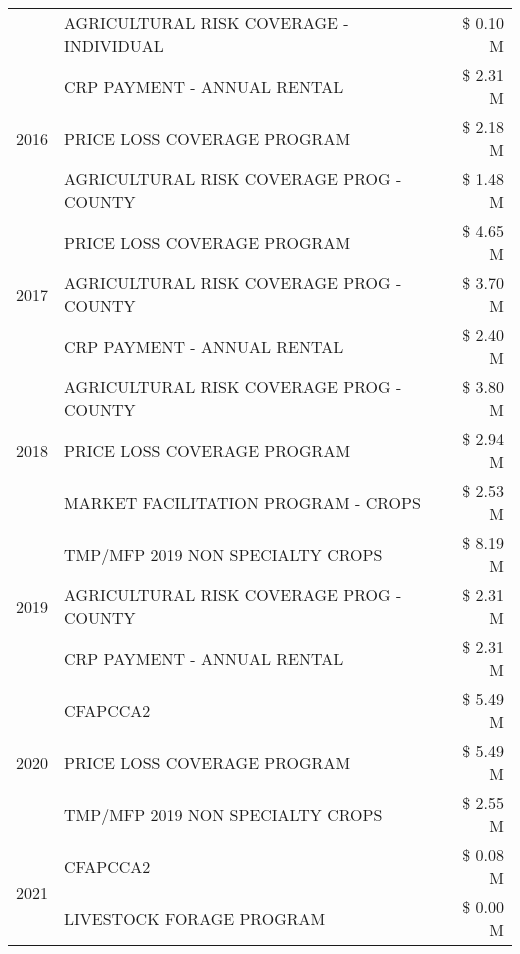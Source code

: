 \begin{tabular}{llr}
 & AGRICULTURAL RISK COVERAGE - INDIVIDUAL & \$ 0.10 M \\
\cline{1-3}
\multirow[t]{3}{*}{2016} & CRP PAYMENT - ANNUAL RENTAL & \$ 2.31 M \\
 & PRICE LOSS COVERAGE PROGRAM & \$ 2.18 M \\
 & AGRICULTURAL RISK COVERAGE PROG - COUNTY & \$ 1.48 M \\
\cline{1-3}
\multirow[t]{3}{*}{2017} & PRICE LOSS COVERAGE PROGRAM & \$ 4.65 M \\
 & AGRICULTURAL RISK COVERAGE PROG - COUNTY & \$ 3.70 M \\
 & CRP PAYMENT - ANNUAL RENTAL & \$ 2.40 M \\
\cline{1-3}
\multirow[t]{3}{*}{2018} & AGRICULTURAL RISK COVERAGE PROG - COUNTY & \$ 3.80 M \\
 & PRICE LOSS COVERAGE PROGRAM & \$ 2.94 M \\
 & MARKET FACILITATION PROGRAM - CROPS & \$ 2.53 M \\
\cline{1-3}
\multirow[t]{3}{*}{2019} & TMP/MFP 2019 NON SPECIALTY CROPS & \$ 8.19 M \\
 & AGRICULTURAL RISK COVERAGE PROG - COUNTY & \$ 2.31 M \\
 & CRP PAYMENT - ANNUAL RENTAL & \$ 2.31 M \\
\cline{1-3}
\multirow[t]{3}{*}{2020} & CFAPCCA2 & \$ 5.49 M \\
 & PRICE LOSS COVERAGE PROGRAM & \$ 5.49 M \\
 & TMP/MFP 2019 NON SPECIALTY CROPS & \$ 2.55 M \\
\cline{1-3}
\multirow[t]{2}{*}{2021} & CFAPCCA2 & \$ 0.08 M \\
 & LIVESTOCK FORAGE PROGRAM & \$ 0.00 M \\
\cline{1-3}
\bottomrule
\end{tabular}
